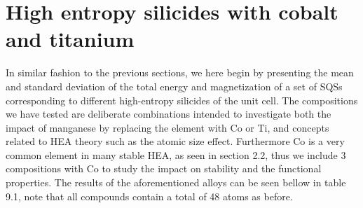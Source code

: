 \section{High entropy silicides with cobalt and titanium}

In similar fashion to the previous sections, we here begin by presenting the mean and standard deviation of the total energy and magnetization of a set of SQSs corresponding to different high-entropy silicides of the  unit cell. The compositions we have tested are deliberate combinations intended to investigate both the impact of manganese by replacing the element with Co or Ti, and concepts related to HEA theory such as the atomic size effect. Furthermore Co is a very common element in many stable HEA, as seen in section 2.2, thus we include 3 compositions with Co to study the impact on stability and the functional properties. The results of the aforementioned alloys can be seen bellow in table 9.1, note that all compounds contain a total of 48 atoms as before.  


